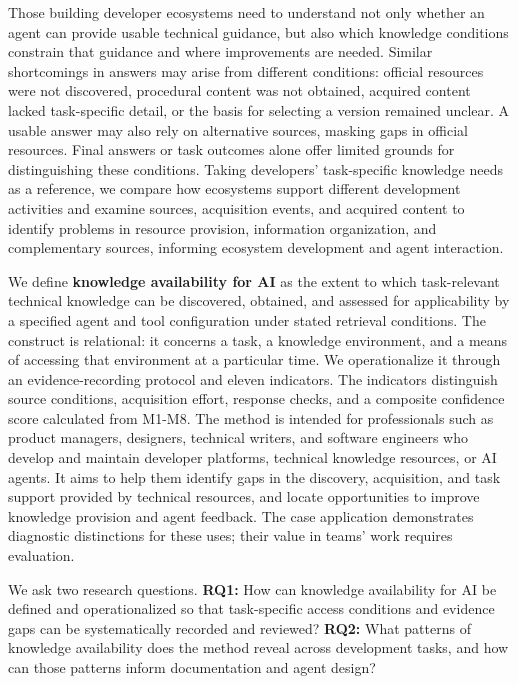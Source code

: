 \documentclass[manuscript,review,anonymous]{acmart}
\begin{document}
Those building developer ecosystems need to understand not only whether an agent can provide usable technical guidance, but also which knowledge conditions constrain that guidance and where improvements are needed. Similar shortcomings in answers may arise from different conditions: official resources were not discovered, procedural content was not obtained, acquired content lacked task-specific detail, or the basis for selecting a version remained unclear. A usable answer may also rely on alternative sources, masking gaps in official resources. Final answers or task outcomes alone offer limited grounds for distinguishing these conditions. Taking developers' task-specific knowledge needs as a reference, we compare how ecosystems support different development activities and examine sources, acquisition events, and acquired content to identify problems in resource provision, information organization, and complementary sources, informing ecosystem development and agent interaction.

We define \textbf{knowledge availability for AI} as the extent to which task-relevant technical knowledge can be discovered, obtained, and assessed for applicability by a specified agent and tool configuration under stated retrieval conditions. The construct is relational: it concerns a task, a knowledge environment, and a means of accessing that environment at a particular time. We operationalize it through an evidence-recording protocol and eleven indicators. The indicators distinguish source conditions, acquisition effort, response checks, and a composite confidence score calculated from M1-M8. The method is intended for professionals such as product managers, designers, technical writers, and software engineers who develop and maintain developer platforms, technical knowledge resources, or AI agents. It aims to help them identify gaps in the discovery, acquisition, and task support provided by technical resources, and locate opportunities to improve knowledge provision and agent feedback. The case application demonstrates diagnostic distinctions for these uses; their value in teams' work requires evaluation.

We ask two research questions. \textbf{RQ1:} How can knowledge availability for AI be defined and operationalized so that task-specific access conditions and evidence gaps can be systematically recorded and reviewed? \textbf{RQ2:} What patterns of knowledge availability does the method reveal across development tasks, and how can those patterns inform documentation and agent design?
\end{document}
